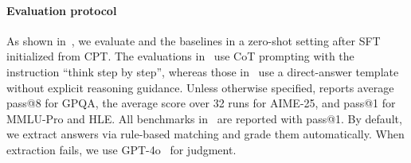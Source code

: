 \paragraph{Evaluation protocol}
As shown in~, we evaluate \methodname and the baselines in a zero-shot setting after SFT initialized from CPT. 
The evaluations in~ use CoT prompting with the instruction ``think step by step'', whereas those in~ use a direct-answer template without explicit reasoning guidance. 
Unless otherwise specified,  reports average pass@8 for GPQA, the average score over 32 runs for AIME-25, and pass@1 for MMLU-Pro and HLE. 
All benchmarks in~ are reported with pass@1.
By default, we extract answers via rule-based matching and grade them automatically. When extraction fails, we use GPT-4o~\citep{hurst2024gpt} for judgment.



